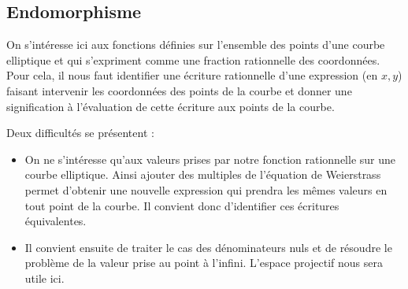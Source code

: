 \subsection{Endomorphisme}
On s'intéresse ici aux fonctions définies sur l'ensemble des points d'une courbe elliptique et qui s'expriment comme une fraction rationnelle des coordonnées. Pour cela, il nous faut identifier une écriture rationnelle d'une expression (en $x, y$) faisant intervenir les coordonnées des points de la courbe et donner une signification à l'évaluation de cette écriture aux points de la courbe.

Deux difficultés se présentent :
\begin{itemize}[label=--]
    \item On ne s'intéresse qu'aux valeurs prises par notre fonction rationnelle sur une courbe elliptique. Ainsi ajouter des multiples de l'équation de Weierstrass permet d'obtenir une nouvelle expression qui prendra les mêmes valeurs en tout point de la courbe. Il convient donc d'identifier ces écritures équivalentes.
    \item Il convient ensuite de traiter le cas des dénominateurs nuls et de résoudre le problème de la valeur prise au point à l'infini. L'espace projectif nous sera utile ici.
\end{itemize}

